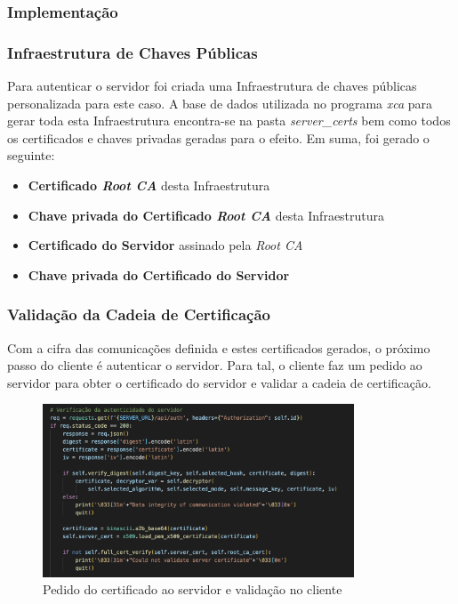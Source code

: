\documentclass[10pt,english]{article}
\begin{document}
\subsubsection{Implementação}

\subsubsection{Infraestrutura de Chaves Públicas}

\par Para autenticar o servidor foi criada uma Infraestrutura de chaves públicas personalizada para este caso. A base de dados utilizada no programa \textit{xca} para gerar toda esta Infraestrutura encontra-se na pasta \textit{server\_certs} bem como todos os certificados e chaves privadas geradas para o efeito. Em suma, foi gerado o seguinte:

\begin{itemize}
    \item \textbf{Certificado \textit{Root CA}} desta Infraestrutura
    \item \textbf {Chave privada do Certificado \textit{Root CA}} desta Infraestrutura
     \item \textbf{Certificado do Servidor} assinado pela \textit{Root CA}
     \item \textbf{Chave privada do Certificado do Servidor}
\end{itemize}

\subsubsection{Validação da Cadeia de Certificação}

\par Com a cifra das comunicações definida e estes certificados gerados, o próximo passo do cliente é autenticar o servidor. Para tal, o cliente faz um pedido ao servidor para obter o certificado do servidor e validar a cadeia de certificação.

\begin{figure}[!h]
        \centering
        \includegraphics[width=350]{images/server_auth_1_client.png}
        \caption{Pedido do certificado ao servidor e validação no cliente}
\end{figure}
\end{document}
